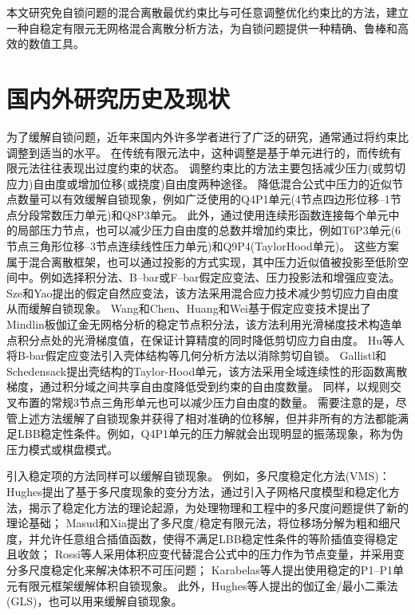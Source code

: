 本文研究免自锁问题的混合离散最优约束比与可任意调整优化约束比的方法，建立一种自稳定有限元无网格混合离散分析方法，为自锁问题提供一种精确、鲁棒和高效的数值工具。
\section{国内外研究历史及现状}
为了缓解自锁问题，近年来国内外许多学者进行了广泛的研究，通常通过将约束比调整到适当的水平。
在传统有限元法中，这种调整是基于单元进行的，而传统有限元法往往表现出过度约束的状态。
调整约束比的方法主要包括减少压力(或剪切应力)自由度或增加位移(或挠度)自由度两种途径。
降低混合公式中压力的近似节点数量可以有效缓解自锁现象，例如广泛使用的Q4P1单元(4节点四边形位移--1节点分段常数压力单元)和Q8P3单元。
此外，通过使用连续形函数连接每个单元中的局部压力节点，也可以减少压力自由度的总数并增加约束比，例如T6P3单元(6节点三角形位移--3节点连续线性压力单元)和Q9P4(TaylorHood单元)\cite{hood1974}。
这些方案属于混合离散框架，也可以通过投影的方式实现，其中压力近似值被投影至低阶空间中。例如选择积分法\cite{malkus1978,shilt2020}、B--bar或F--bar假定应变法\cite{simo1990,broccardo2009,coombs2018,saloustros2021,rodriguez2023}、压力投影法\cite{simo1985,dohrmann2004}和增强应变法\cite{lovadina2003}。
Sze和Yao\cite{Sze2000}提出的假定自然应变法，该方法采用混合应力技术减少剪切应力自由度从而缓解自锁现象。
Wang和Chen\cite{Wang2004}、Huang和Wei\cite{huang2022}基于假定应变技术提出了Mindlin板伽辽金无网格分析的稳定节点积分法，该方法利用光滑梯度技术构造单点积分点处的光滑梯度值，在保证计算精度的同时降低剪切应力自由度。
Hu等人\cite{hu2020}将B-bar假定应变法引入壳体结构等几何分析方法以消除剪切自锁。
Gallistl和Schedensack\cite{Gallistl2021}提出壳结构的Taylor-Hood单元，该方法采用全域连续性的形函数离散梯度，通过积分域之间共享自由度降低受到约束的自由度数量。
同样，以规则交叉布置的常规3节点三角形单元也可以减少压力自由度的数量\cite{bathe2001}。
需要注意的是，尽管上述方法缓解了自锁现象并获得了相对准确的位移解，但并非所有的方法都能满足LBB稳定性条件。例如，Q4P1单元的压力解就会出现明显的振荡现象，称为伪压力模式或棋盘模式\cite{bathe2001}。

引入稳定项的方法同样可以缓解自锁现象。
例如，多尺度稳定化方法(VMS)：Hughes\cite{hughes1995}提出了基于多尺度现象的变分方法，通过引入子网格尺度模型和稳定化方法，揭示了稳定化方法的理论起源，为处理物理和工程中的多尺度问题提供了新的理论基础；
Masud和Xia\cite{masud2005}提出了多尺度/稳定有限元法，将位移场分解为粗和细尺度，并允许任意组合插值函数，使得不满足LBB稳定性条件的等阶插值变得稳定且收敛；
Rossi等人\cite{Rossi2021}采用体积应变代替混合公式中的压力作为节点变量，并采用变分多尺度稳定化来解决体积不可压问题；
Karabelas等人\cite{karabelas2022}提出使用稳定的P1--P1单元有限元框架缓解体积自锁现象。
此外，Hughes等人\cite{hughes1986}提出的伽辽金/最小二乘法(GLS)，也可以用来缓解自锁现象。

